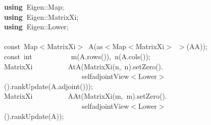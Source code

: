 \documentclass[shortnames,article,nojss]{jss}
\newcommand{\hlstd}[1]{\textcolor[rgb]{0,0,0}{#1}}
\newcommand{\hlopt}[1]{\textcolor[rgb]{0,0,0}{#1}}
\newcommand{\hlkwa}[1]{\textcolor[rgb]{0.61,0.13,0.93}{\bf{#1}}}
\newcommand{\hlkwb}[1]{\textcolor[rgb]{0.13,0.54,0.13}{#1}}
\newcommand{\hlkwd}[1]{\textcolor[rgb]{0,0,0}{#1}}
\begin{document}
\begin{figure}[htb]
    \noindent
    \ttfamily
    \hlstd{}\hlkwa{using\ }\hlstd{Eigen}\hlopt{::}\hlstd{Map}\hlopt{;}\hspace*{\fill}\\
    \hlstd{}\hlkwa{using\ }\hlstd{Eigen}\hlopt{::}\hlstd{MatrixXi}\hlopt{;}\hspace*{\fill}\\
    \hlstd{}\hlkwa{using\ }\hlstd{Eigen}\hlopt{::}\hlstd{Lower}\hlopt{;}\hspace*{\fill}\\
    \hlstd{}\hspace*{\fill}\\
    \hlkwb{const\ }\hlstd{Map}\hlopt{$<$}\hlstd{MatrixXi}\hlopt{$>$\ }\hlstd{}\hlkwd{A}\hlstd{}\hlopt{(}\hlstd{as}\hlopt{$<$}\hlstd{Map}\hlopt{$<$}\hlstd{MatrixXi}\hlopt{$>$\ $>$(}\hlstd{AA}\hlopt{));}\hspace*{\fill}\\
    \hlstd{}\hlkwb{const\ int}\hlstd{\ \ \ \ \ \ \ \ \ \ \ }\hlkwb{}\hlstd{}\hlkwd{m}\hlstd{}\hlopt{(}\hlstd{A}\hlopt{.}\hlstd{}\hlkwd{rows}\hlstd{}\hlopt{()),\ }\hlstd{}\hlkwd{n}\hlstd{}\hlopt{(}\hlstd{A}\hlopt{.}\hlstd{}\hlkwd{cols}\hlstd{}\hlopt{());}\hspace*{\fill}\\
    \hlstd{MatrixXi}\hlstd{\ \ \ \ \ \ \ \ \ \ }\hlstd{}\hlkwd{AtA}\hlstd{}\hlopt{(}\hlstd{}\hlkwd{MatrixXi}\hlstd{}\hlopt{(}\hlstd{n}\hlopt{,\ }\hlstd{n}\hlopt{).}\hlstd{}\hlkwd{setZero}\hlstd{}\hlopt{().}\hspace*{\fill}\\
    \hlstd{}\hlstd{\ \ \ \ \ \ \ \ \ \ \ \ \ \ \ \ \ \ \ \ \ \ }\hlstd{selfadjointView}\hlopt{$<$}\hlstd{Lower}\hlopt{$>$().}\hlstd{}\hlkwd{rankUpdate}\hlstd{}\hlopt{(}\hlstd{A}\hlopt{.}\hlstd{}\hlkwd{adjoint}\hlstd{}\hlopt{()));}\hspace*{\fill}\\
    \hlstd{MatrixXi}\hlstd{\ \ \ \ \ \ \ \ \ \ }\hlstd{}\hlkwd{AAt}\hlstd{}\hlopt{(}\hlstd{}\hlkwd{MatrixXi}\hlstd{}\hlopt{(}\hlstd{m}\hlopt{,\ }\hlstd{m}\hlopt{).}\hlstd{}\hlkwd{setZero}\hlstd{}\hlopt{().}\hspace*{\fill}\\
    \hlstd{}\hlstd{\ \ \ \ \ \ \ \ \ \ \ \ \ \ \ \ \ \ \ \ \ \ }\hlstd{selfadjointView}\hlopt{$<$}\hlstd{Lower}\hlopt{$>$().}\hlstd{}\hlkwd{rankUpdate}\hlstd{}\hlopt{(}\hlstd{A}\hlopt{));}\hspace*{\fill}\\

\end{figure}
\end{document}
